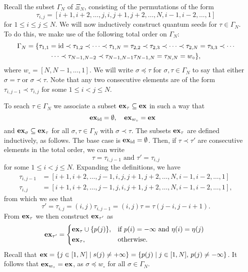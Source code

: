 Recall the subset $\Gamma_N$ of $\Xi_N$, consisting of the permutations of the form
\begin{equation*}
	\tau_{i, j} = [i+1, i+2, \dots, j, i , j+1, j+2, \dots, N, i-1, i-2, \dots, 1]
\end{equation*}
%
for $1 \leq i \leq j \leq N$. We will now inductively construct quantum seeds for $\tau
	\in \Gamma_N$. To do this, we make use of the following total order on $\Gamma_N$:
\begin{multline*}
	\Gamma_N = \{\tau_{1,1} = \operatorname{id} \prec \tau_{1,2} \prec \cdots \prec \tau_{1, N} = \tau_{2,2} \prec \tau_{2,3} \prec \cdots \prec \tau_{2,N} = \tau_{3,3} \prec \cdots\\ \cdots \prec \tau_{N-1, N-2} \prec \tau_{N-1, N-1} \tau_{N-1, N} = \tau_{N, N} = w_\circ \},
\end{multline*}
%
where $w_\circ = [N, N-1, \dots, 1]$. We will write $\sigma \preceq \tau$ for $\sigma,
	\tau \in \Gamma_N$ to say that either $\sigma = \tau$ or $\sigma \prec \tau$. Note that
any two consecutive elements are of the form $\tau_{i, j-1} \prec \tau_{i, j}$ for some
$1 \leq i < j \leq N$.

To seach $\tau \in \Gamma_N$ we associate a subset $\mathbf{ex}_\tau \subseteq \mathbf{ex}$ in such a
way that
\begin{equation*}
	\mathbf{ex}_{\operatorname{id}} = \emptyset, \quad \mathbf{ex}_{w_\circ} = \mathbf{ex} \quad
\end{equation*}
%
and $\mathbf{ex}_\sigma \subseteq \mathbf{ex}_\tau$ for all $\sigma, \tau \in \Gamma_N$ with $\sigma
	\prec \tau$. The subsets $\mathbf{ex}_\tau$ are defined inductively, as follows. The base case
is $\mathbf{ex}_{\operatorname{id}} = \emptyset$. Then, if $\tau \prec \tau'$ are consecutive elements in the
total order, we can write
\begin{equation*}
	\tau = \tau_{i,j-1} \text{ and } \tau' = \tau_{i,j}
\end{equation*}
%
for some $1 \leq i < j \leq N$. Expanding the definitions, we have
\begin{align*}
	\tau_{i, j-1} & = [i+1, i+2, \dots, j - 1, i , j, j+1, j+2, \dots, N, i-1, i-2, \dots, 1] \\
	\tau_{i, j}   & = [i+1, i+2, \dots,j-1,  j, i , j+1, j+2, \dots, N, i-1, i-2, \dots, 1],
\end{align*}
%
from which we see that
\begin{equation*}
	\tau' = \tau_{i,j} = (i, j)\tau_{i, j-1} = (i, j)\tau = \tau(j-i, j-i+1).
\end{equation*}
%
From $\mathbf{ex}_\tau$ we then construct $\mathbf{ex}_{\tau'}$ as
\begin{equation*}
	\ex_{\tau'} = \begin{dcases*}
		\ex_\tau \cup \{p(j)\}, & if $p(i) = -\infty$ and $\eta(i) = \eta(j)$ \\
		\ex_\tau,               & otherwise.
	\end{dcases*}
\end{equation*}
%
Recall that $\mathbf{ex} = \{j \in [1, N] \mid s(j) \neq + \infty \} = \{p(j) \mid j \in [1,
		N],\, p(j) \neq -\infty\}$. It follows that $\mathbf{ex}_{w_\circ} = \mathbf{ex}$, as $\sigma \preceq
	w_\circ$ for all $\sigma\in \Gamma_N$.

